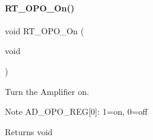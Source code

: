 \paragraph{\texorpdfstring{R\+T\+\_\+\+O\+P\+O\+\_\+\+On()}{RT\_OPO\_On()}}
{\footnotesize\ttfamily void R\+T\+\_\+\+O\+P\+O\+\_\+\+On (\begin{DoxyParamCaption}\item[{void}]{ }\end{DoxyParamCaption})\hspace{0.3cm}{\ttfamily [inline]}}



Turn the Amplifier on. 

\begin{DoxyNote}{Note}
A\+D\+\_\+\+O\+P\+O\+\_\+\+R\+EG\mbox{[}0\mbox{]}\+: 1=on, 0=off 
\end{DoxyNote}
\begin{DoxyReturn}{Returns}
void 
\end{DoxyReturn}
